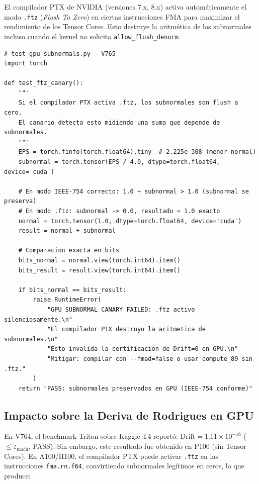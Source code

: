 El compilador PTX de NVIDIA (versiones 7.x, 8.x) activa automáticamente el modo
\texttt{.ftz} (\textit{Flush To Zero}) en ciertas instrucciones FMA para maximizar el
rendimiento de los Tensor Cores. Esto destruye la aritmética de los subnormales incluso
cuando el kernel no solicita \texttt{allow\_flush\_denorm}.

\begin{lstlisting}[style=pythonstyle, caption={Canario numérico: detecta .ftz activo en GPU}]
# test_gpu_subnormals.py — V765
import torch

def test_ftz_canary():
    """
    Si el compilador PTX activa .ftz, los subnormales son flush a cero.
    El canario detecta esto midiendo una suma que depende de subnormales.
    """
    EPS = torch.finfo(torch.float64).tiny  # 2.225e-308 (menor normal)
    subnormal = torch.tensor(EPS / 4.0, dtype=torch.float64, device='cuda')
    
    # En modo IEEE-754 correcto: 1.0 + subnormal > 1.0 (subnormal se preserva)
    # En modo .ftz: subnormal -> 0.0, resultado = 1.0 exacto
    normal = torch.tensor(1.0, dtype=torch.float64, device='cuda')
    result = normal + subnormal
    
    # Comparacion exacta en bits
    bits_normal = normal.view(torch.int64).item()
    bits_result = result.view(torch.int64).item()
    
    if bits_normal == bits_result:
        raise RuntimeError(
            "GPU SUBNORMAL CANARY FAILED: .ftz activo silenciosamente.\n"
            "El compilador PTX destruyo la aritmetica de subnormales.\n"
            "Esto invalida la certificacion de Drift=0 en GPU.\n"
            "Mitigar: compilar con --fmad=false o usar compute_89 sin .ftz."
        )
    return "PASS: subnormales preservados en GPU (IEEE-754 conforme)"
\end{lstlisting}

\subsection{Impacto sobre la Deriva de Rodrigues en GPU}

En V764, el benchmark Triton sobre Kaggle T4 reportó:
$\text{Drift} = 1.11 \times 10^{-16}$ ($\le \varepsilon_{\text{mach}}$, PASS).
Sin embargo, este resultado fue obtenido en P100 (sin Tensor Cores). En A100/H100,
el compilador PTX puede activar \texttt{.ftz} en las instrucciones \texttt{fma.rn.f64},
convirtiendo subnormales legítimos en ceros, lo que produce:

